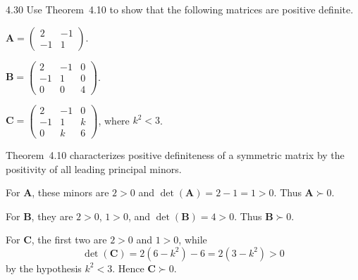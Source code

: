 \documentclass[11pt,oneside]{article}
\begin{document}
\begin{problem}{4.30}
Use Theorem~4.10 to show that the following matrices are positive definite.
\begin{problemsubparts}
\item $\displaystyle\mathbf A=\begin{pmatrix}2&-1\\-1&1\end{pmatrix}$.
\item $\displaystyle\mathbf B=\begin{pmatrix}2&-1&0\\-1&1&0\\0&0&4\end{pmatrix}$.
\item $\displaystyle\mathbf C=\begin{pmatrix}2&-1&0\\-1&1&k\\0&k&6\end{pmatrix}$,
      where $k^2<3$.
\end{problemsubparts}
\end{problem}
\begin{solution}
Theorem~4.10 characterizes positive definiteness of a symmetric
matrix by the positivity of all leading principal minors.
\begin{problemsubparts}
\item For $\mathbf A$, these minors are
$2>0$ and $\det(\mathbf A)=2-1=1>0$.
Thus $\boxed{\mathbf A\succ0}$.
\item For $\mathbf B$, they are
$2>0$, $1>0$, and $\det(\mathbf B)=4>0$.
Thus $\boxed{\mathbf B\succ0}$.
\item For $\mathbf C$, the first two are $2>0$ and $1>0$, while
\[
 \det(\mathbf C)
 =2(6-k^2)-6=2(3-k^2)>0
\]
by the hypothesis $k^2<3$. Hence $\boxed{\mathbf C\succ0}$.
\end{problemsubparts}
\end{solution}
\end{document}
